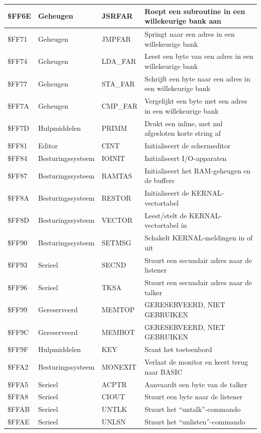 \begin{longtable}{|L{1.2cm}|p{2.5cm}|p{2cm}|L{6cm}|}
\hline
\$FF6E & Geheugen & JSRFAR & Roept een subroutine in een willekeurige bank aan \\
\hline
\$FF71 & Geheugen & JMPFAR & Springt naar een adres in een willekeurige bank \\
\hline
\$FF74 & Geheugen & LDA\_FAR & Leest een byte van een adres in een willekeurige bank \\
\hline
\$FF77 & Geheugen & STA\_FAR & Schrijft een byte naar een adres in een willekeurige bank \\
\hline
\$FF7A & Geheugen & CMP\_FAR & Vergelijkt een byte met een adres in een willekeurige bank \\
\hline
\$FF7D & Hulpmiddelen & PRIMM & Drukt een inline, met nul afgesloten korte string af \\
\hline
\$FF81 & Editor & CINT & Initialiseert de schermeditor \\
\hline
\$FF84 & Besturingssysteem & IOINIT & Initialiseert I/O-apparaten \\
\hline
\$FF87 & Besturingssysteem & RAMTAS & Initialiseert het RAM-geheugen en de buffers \\
\hline
\$FF8A & Besturingssysteem & RESTOR & Initialiseert de KERNAL-vectortabel \\
\hline
\$FF8D & Besturingssysteem & VECTOR & Leest/stelt de KERNAL-vectortabel in \\
\hline
\$FF90 & Besturingssysteem & SETMSG & Schakelt KERNAL-meldingen in of uit \\
\hline
\$FF93 & Serieel & SECND & Stuurt een secundair adres naar de listener \\
\hline
\$FF96 & Serieel & TKSA & Stuurt een secundair adres naar de talker \\
\hline
\$FF99 & Gereserveerd & MEMTOP & GERESERVEERD, NIET GEBRUIKEN \\
\hline
\$FF9C & Gereserveerd & MEMBOT & GERESERVEERD, NIET GEBRUIKEN \\
\hline
\$FF9F & Hulpmiddelen & KEY & Scant het toetsenbord \\
\hline
\$FFA2 & Besturingssysteem & MONEXIT & Verlaat de monitor en keert terug naar BASIC \\
\hline
\$FFA5 & Serieel & ACPTR & Aanvaardt een byte van de talker \\
\hline
\$FFA8 & Serieel & CIOUT & Stuurt een byte naar de listener \\
\hline
\$FFAB & Serieel & UNTLK & Stuurt het ``untalk''-commando \\
\hline
\$FFAE & Serieel & UNLSN & Stuurt het ``unlisten''-commando \\

\end{longtable}
